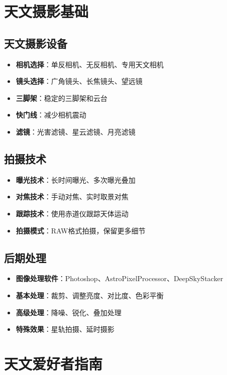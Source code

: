 \documentclass[12pt,UTF8]{ctexbook}
\begin{document}
\chapter{天文摄影基础}
\section{天文摄影设备}

\begin{itemize}
  \item \textbf{相机选择}：单反相机、无反相机、专用天文相机
  \item \textbf{镜头选择}：广角镜头、长焦镜头、望远镜
  \item \textbf{三脚架}：稳定的三脚架和云台
  \item \textbf{快门线}：减少相机震动
  \item \textbf{滤镜}：光害滤镜、星云滤镜、月亮滤镜
\end{itemize}

\section{拍摄技术}

\begin{itemize}
  \item \textbf{曝光技术}：长时间曝光、多次曝光叠加
  \item \textbf{对焦技术}：手动对焦、实时取景对焦
  \item \textbf{跟踪技术}：使用赤道仪跟踪天体运动
  \item \textbf{拍摄模式}：RAW格式拍摄，保留更多细节
\end{itemize}

\section{后期处理}

\begin{itemize}
  \item \textbf{图像处理软件}：Photoshop、AstroPixelProcessor、DeepSkyStacker
  \item \textbf{基本处理}：裁剪、调整亮度、对比度、色彩平衡
  \item \textbf{高级处理}：降噪、锐化、叠加处理
  \item \textbf{特殊效果}：星轨拍摄、延时摄影
\end{itemize}

\chapter{天文爱好者指南}
\end{document}
